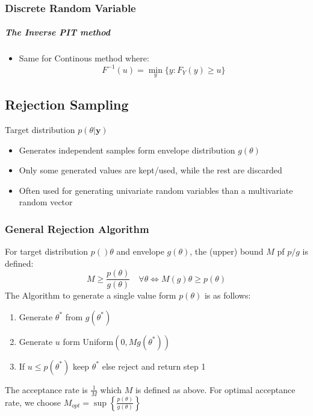 \documentclass[12pt]{article}
\theoremstyle{definition}
\begin{document}
\subsubsection*{Discrete Random Variable}
    \subparagraph*{The Inverse PIT method}
    \begin{itemize}
        \item Same for Continous method where:$$F^{-1}(u) = \min_y\{y:F_Y(y)\geq u\}$$
    \end{itemize} 

\newpage
\subsection*{Rejection Sampling}
Target distribution $p(\theta|\bm{y})$
\begin{itemize}
    \item Generates independent samples form envelope distribution $g(\theta)$
    \item Only some generated values are kept/used, while the rest are discarded
    \item Often used for generating univariate random variables than a multivariate random vector
\end{itemize}
    \subsubsection*{General Rejection Algorithm}
    For target distribution $p()\theta$ and envelope $g(\theta)$, the (upper) bound $M$ pf $p/g$ is defined:
    $$M \geq \frac{p(\theta)}{g(\theta)} \quad \forall \theta \Leftrightarrow M(g)\theta \geq p(\theta)$$
    The Algorithm to generate a single value form $p(\theta)$ is as follows:
    \begin{enumerate}
        \item Generate $\theta^*$ from $g(\theta^*)$
        \item Generate $u$ form Uniform$(0,Mg(\theta^*))$
        \item If $u \leq p(\theta^*)$ keep $\theta^*$ else reject and return step 1
    \end{enumerate}
    The acceptance rate is $\frac{1}{M}$ which $M$ is defined as above. For optimal acceptance rate, we choose $M_{opt} = \sup\left\{\frac{p(\theta)}{g(\theta)}\right\}$
\end{document}
